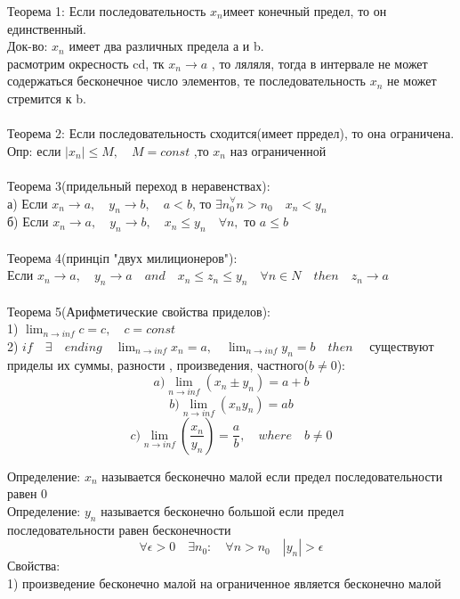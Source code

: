 \documentclass[a4paper, 12pt]{article}
\begin{document}
\begin{mdframed}[backgroundcolor=blue!20] 
       Теорема 1: Если последовательность $  {x_n}$имеет конечный предел, то он единственный.\\
       Док-во: ${x_n}$ имеет два различных предела а и b.\\ расмотрим окресность cd, тк  $  x_n \to a$ , то ляляля, тогда в интервале не может содержаться бесконечное число элементов, те последовательность $  {x_n}$ не может стремится к b.\\ \\
       Теорема 2: Если последовательность сходится(имеет прредел), то она ограничена.
       Опр: если $ |x_n| \leq M, \quad  M = const$ ,то $  {x_n}$ наз ограниченной\\ \\ 
          Теорема 3(придельный переход в неравенствах):\\
         а) Если $  x_n \to a, \quad y_n \to b, \quad a < b$, то $  \exists n_0^\forall n>n_0 \quad x_n < y_n$\\
         б) Если $  x_n \to a, \quad y_n \to b,\quad x_n \leq y_n \quad \forall n, $ то $ a \leq b $ \\ \\ 
       Теорема 4(принцiп "двух милиционеров"):\\
       Если $  x_n \to a, \quad y_n \to a \quad and \quad x_n \leq z_n \leq y_n \quad \forall n \in N \quad then \quad z_n \to a$ \\ \\
       Теорема 5(Арифметические свойства приделов):\\
       1) $ \lim_{n\to inf} c = c, \quad c = const  $\\
       2) $  if \quad \exists \quad ending \quad \lim_{n\to inf} x_n = a, \quad \lim_{n\to inf} y_n = b \quad then \quad  $ существуют приделы их суммы, разности , произведения, частного($  b \neq 0$):\\
       	\[a)   \lim_{n\to inf} (x_n \pm y_n) = a + b\] 
       	\[b)   \lim_{n\to inf} (x_n y_n) = ab \]
       \[	c)   \lim_{n\to inf} \left(\frac{x_n}{y_n}\right) = \frac{a}{b},\quad where \quad b\neq 0 \]

       Определение: $ {x_n} $ называется бесконечно малой если предел последовательности равен 0\\
       
       Определение: $ {y_n} $ называется бесконечно большой если предел последовательности равен бесконечности \[
       	\forall \epsilon > 0 \quad \exists n_0 : \quad \forall n > n_0 \quad |y_n| > \epsilon
       \]
       Свойства:\\
       1) произведение бесконечно малой на ограниченное является бесконечно малой\\
    \end{mdframed}
\end{document}
